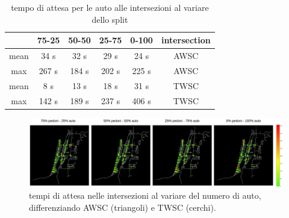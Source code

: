 \begin{table}[ht]
    \centering
    \begin{tabular}{|c|c|c|c|c|c|}
    \hline
         & 75-25 & 50-50 & 25-75 & 0-100 & intersection \\ \hline
    mean & 34 s  & 32 s  & 29 s  & 24 s  & AWSC         \\ \hline
    max  & 267 s & 184 s & 202 s & 225 s & AWSC         \\ \hline
    mean & 8 s   & 13 s  & 18 s  & 31 s  & TWSC         \\ \hline
    max  & 142 s & 189 s & 237 s & 406 s & TWSC         \\ \hline
    \end{tabular}
    \caption{tempo di attesa per le auto alle intersezioni al variare dello split}
    \label{tab:analisi-car-delay}
\end{table}


\newpage


\begin{figure}[ht]
    \includegraphics[width=1\textwidth]{images/analisi/comparison-car-delay.png}   
    \caption{tempi di attesa nelle intersezioni al variare del numero di auto, differenziando AWSC (triangoli) e TWSC (cerchi).}
    \label{fig:analisi-comparison-car-delay}
\end{figure}

\lipsum[1]

